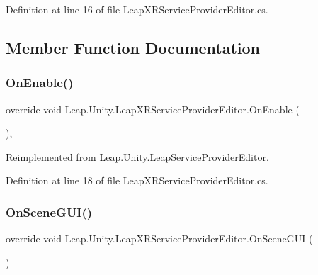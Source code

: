 Definition at line 16 of file Leap\+X\+R\+Service\+Provider\+Editor.\+cs.



\subsection{Member Function Documentation}
\mbox{\label{class_leap_1_1_unity_1_1_leap_x_r_service_provider_editor_af1b2b20f9a7da319b8c6b5b8b95f9e9c}} 
\subsubsection{\texorpdfstring{OnEnable()}{OnEnable()}}
{\footnotesize\ttfamily override void Leap.\+Unity.\+Leap\+X\+R\+Service\+Provider\+Editor.\+On\+Enable (\begin{DoxyParamCaption}{ }\end{DoxyParamCaption})\hspace{0.3cm}{\ttfamily [protected]}, {\ttfamily [virtual]}}



Reimplemented from \mbox{\hyperlink{class_leap_1_1_unity_1_1_leap_service_provider_editor_ab843b1617ce2fff5b73493530fc4e959}{Leap.\+Unity.\+Leap\+Service\+Provider\+Editor}}.



Definition at line 18 of file Leap\+X\+R\+Service\+Provider\+Editor.\+cs.

\mbox{\label{class_leap_1_1_unity_1_1_leap_x_r_service_provider_editor_af109f9fa67a87b0802b3a55f291726ba}} 
\subsubsection{\texorpdfstring{OnSceneGUI()}{OnSceneGUI()}}
{\footnotesize\ttfamily override void Leap.\+Unity.\+Leap\+X\+R\+Service\+Provider\+Editor.\+On\+Scene\+G\+UI (\begin{DoxyParamCaption}{ }\end{DoxyParamCaption})\hspace{0.3cm}{\ttfamily [virtual]}}



